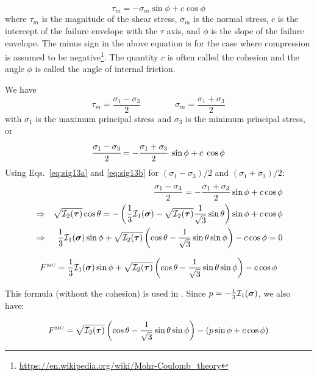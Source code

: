 \begin{equation}
\tau_m = -\sigma_m \sin \phi + c \cos \phi  \label{eq:mccrit}
\end{equation}
where $\tau_m$ is the magnitude of the shear stress, 
$\sigma_m$ is the normal stress, $c$ is the intercept of the failure envelope with the $\tau$ axis, 
and $\phi$ is the slope of the failure envelope.
The minus sign in the above equation is for the case where compression is assumed to be 
negative\footnote{\url{https://en.wikipedia.org/wiki/Mohr-Coulomb_theory}}.
The quantity $c$ is often called the cohesion and the angle $\phi$ is called the angle of internal friction.
 
We have  
\[
\tau_m=\frac{\sigma_1-\sigma_3}{2}
\qquad
\qquad
\sigma_m = \frac{\sigma_1+\sigma_3}{2}
\]
with $\sigma_1$ is the maximum principal stress and $\sigma_3$ is the minimum principal stress, or
\begin{equation}
\cfrac{\sigma_1-\sigma_3}{2} = -\cfrac{\sigma_1+\sigma_3}{2}~\sin\phi +c\; \cos\phi 
\end{equation}
Using Eqs.~\eqref{eq:sig13a} and \eqref{eq:sig13b} 
for $(\sigma_1 - \sigma_3 )/2$ and $(\sigma_1 + \sigma_3 )/2$:
\begin{eqnarray}
&& \frac{\sigma_1 - \sigma_3}{2} = -\frac{\sigma_1 + \sigma_3}{2} \sin \phi  + c \cos \phi \nonumber\\
&\Rightarrow&
\sqrt{  {\cal I}_2({\bm \tau}) } \cos \theta = -\left(\frac{1}{3}{\cal I}_1({\bm \sigma}) - \sqrt{  {\cal I}_2({\bm \tau})} \frac{1}{\sqrt{3}} \sin \theta \right) \sin \phi 
+ c \cos \phi \nonumber\\
&\Rightarrow&
\frac{1}{3} {\cal I}_1({\bm \sigma}) \sin \phi  
+ \sqrt{  {\cal I}_2({\bm \tau}) } \left( \cos \theta - \frac{1}{\sqrt{3}} \sin \theta  \sin \phi \right) - c \cos \phi = 0 \nonumber
\end{eqnarray}

\begin{mdframed}[backgroundcolor=blue!5]
\begin{equation}
F^{\text{\tiny MC}}=\frac{1}{3} {\cal I}_1({\bm \sigma}) \sin \phi  + 
\sqrt{  {\cal I}_2({\bm \tau})  } \left( \cos \theta - \frac{1}{\sqrt{3}} \sin \theta  \sin \phi \right) - c \cos \phi
\label{eq:mcF} 
\end{equation}
\end{mdframed}
This formula (without the cohesion) is used in \textcite{will92}.
Since $p=-\frac{1}{3} {\cal I}_1({\bm \sigma})$, we also have:
\begin{mdframed}[backgroundcolor=blue!5]
\begin{equation}
F^{\text{\tiny MC}}=
\sqrt{  {\cal I}_2({\bm \tau})  } \left( \cos \theta - \frac{1}{\sqrt{3}} \sin \theta  \sin \phi \right) - (p \sin\phi + c \cos \phi)
\end{equation}
\end{mdframed}

